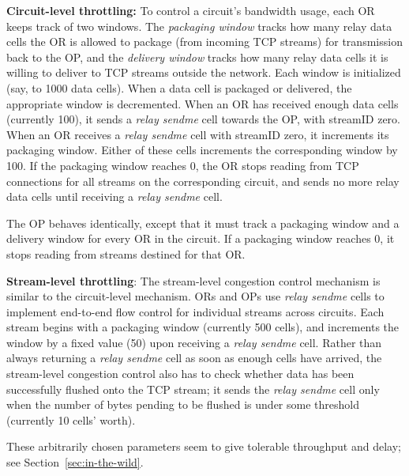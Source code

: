 \documentclass[times,10pt,twocolumn]{article}
\begin{document}
\textbf{Circuit-level throttling:}
To control a circuit's bandwidth usage, each OR keeps track of two
windows. The \emph{packaging window} tracks how many relay data cells the OR is
allowed to package (from incoming TCP streams) for transmission back to the OP,
and the \emph{delivery window} tracks how many relay data cells it is willing
to deliver to TCP streams outside the network. Each window is initialized
(say, to 1000 data cells). When a data cell is packaged or delivered,
the appropriate window is decremented. When an OR has received enough
data cells (currently 100), it sends a \emph{relay sendme} cell towards the OP,
with streamID zero. When an OR receives a \emph{relay sendme} cell with
streamID zero, it increments its packaging window. Either of these cells
increments the corresponding window by 100. If the packaging window
reaches 0, the OR stops reading from TCP connections for all streams
on the corresponding circuit, and sends no more relay data cells until
receiving a \emph{relay sendme} cell.

The OP behaves identically, except that it must track a packaging window
and a delivery window for every OR in the circuit. If a packaging window
reaches 0, it stops reading from streams destined for that OR.

\textbf{Stream-level throttling}:
The stream-level congestion control mechanism is similar to the
circuit-level mechanism. ORs and OPs use \emph{relay sendme} cells
to implement end-to-end flow control for individual streams across
circuits. Each stream begins with a packaging window (currently 500 cells),
and increments the window by a fixed value (50) upon receiving a \emph{relay
sendme} cell. Rather than always returning a \emph{relay sendme} cell as soon
as enough cells have arrived, the stream-level congestion control also
has to check whether data has been successfully flushed onto the TCP
stream; it sends the \emph{relay sendme} cell only when the number of bytes pending
to be flushed is under some threshold (currently 10 cells' worth).


These arbitrarily chosen parameters seem to give tolerable throughput
and delay; see Section~\ref{sec:in-the-wild}.

\label{subsec:rendezvous}
\end{document}
